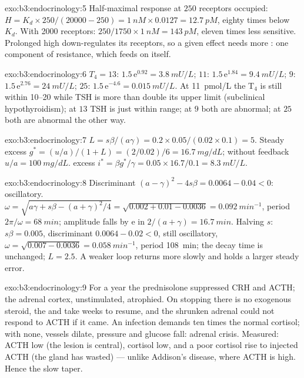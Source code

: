 \begin{solution}{exo:b3:endocrinology:5}
Half-maximal response at $250$ receptors occupied: $H = K_{d}\times
250/(\num{20000} - 250) = \qty{1}{nM}\times 0.0127 = \qty{12.7}{pM}$,
eighty times below $K_{d}$. With \num{2000} receptors: $250/1750
\times \qty{1}{nM} = \qty{143}{pM}$, eleven times less sensitive.
Prolonged high  down-regulates its receptors, so a given effect
needs more : one component of  resistance, which feeds
on itself.
\end{solution}

\begin{solution}{exo:b3:endocrinology:6}
$T_{4} = 13$: $1.5\,\mathrm{e}^{0.92} = \qty{3.8}{mU/L}$; $11$:
$1.5\,\mathrm{e}^{1.84} = \qty{9.4}{mU/L}$; $9$: $1.5\,\mathrm{e}^{2.76}
= \qty{24}{mU/L}$; $25$: $1.5\,\mathrm{e}^{-4.6} = \qty{0.015}{mU/L}$. At
\qty{11}{pmol/L} the T$_{4}$ is still within \qtyrange{10}{20}{} while
TSH is more than double its upper limit (subclinical hypothyroidism);
at $13$ TSH is just within range; at $9$ both are abnormal; at $25$
both are abnormal the other way.
\end{solution}

\begin{solution}{exo:b3:endocrinology:7}
$L = s\beta/(a\gamma) = 0.2\times 0.05/(0.02\times 0.1) = 5$. Steady
excess $g^{*} = (u/a)/(1 + L) = (2/0.02)/6 = \qty{16.7}{mg/dL}$; without
feedback $u/a = \qty{100}{mg/dL}$.  excess $i^{*} = \beta g^{*}/
\gamma = 0.05\times 16.7/0.1 = \qty{8.3}{mU/L}$.
\end{solution}

\begin{solution}{exo:b3:endocrinology:8}
Discriminant $(a - \gamma)^{2} - 4s\beta = 0.0064 - 0.04 < 0$:
oscillatory. $\omega = \sqrt{a\gamma + s\beta - (a+\gamma)^{2}/4} =
\sqrt{0.002 + 0.01 - 0.0036} = \qty{0.092}{min^{-1}}$, period $2\pi/
\omega = \qty{68}{min}$; amplitude falls by $\mathrm{e}$ in $2/(a +
\gamma) = \qty{16.7}{min}$. Halving $s$: $s\beta = 0.005$, discriminant
$0.0064 - 0.02 < 0$, still oscillatory, $\omega = \sqrt{0.007 - 0.0036}
= \qty{0.058}{min^{-1}}$, period \qty{108}{min}; the decay time is
unchanged; $L = 2.5$. A weaker loop returns more slowly and holds a
larger steady error.
\end{solution}

\begin{solution}{exo:b3:endocrinology:9}
For a year the prednisolone suppressed CRH and ACTH; the adrenal
cortex, unstimulated, atrophied. On stopping there is no exogenous
steroid, the  and  take weeks to resume, and the
shrunken adrenal could not respond to ACTH if it came. An infection
demands ten times the normal cortisol; with none, vessels dilate,
pressure and glucose fall: adrenal crisis. Measured: ACTH low (the
lesion is central), cortisol low, and a poor cortisol rise to injected
ACTH (the gland has wasted) --- unlike Addison's disease, where ACTH is
high. Hence the slow taper.
\end{solution}

